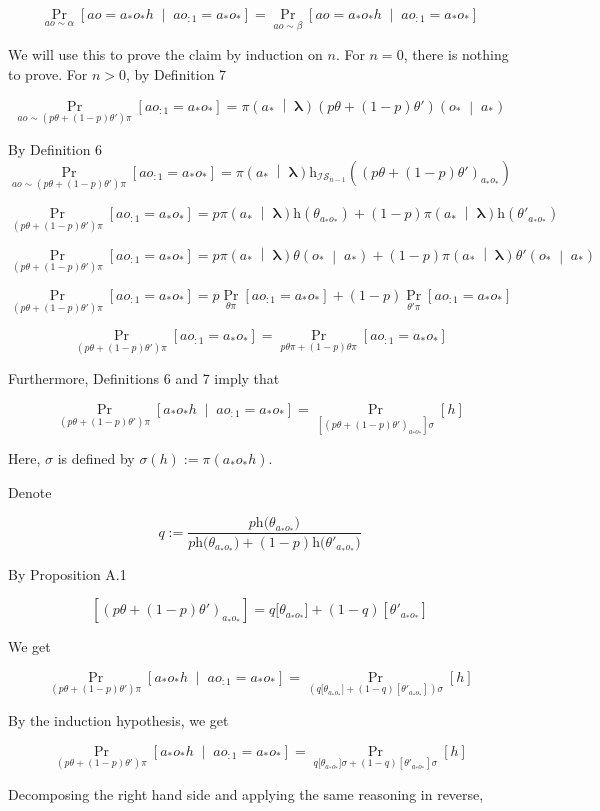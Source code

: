\documentclass[a4paper]{article}
\newcommand{\AP}[1]{\left(#1\right)}
\newcommand{\AB}[1]{\left[#1\right]}
\newcommand{\APM}[2]{\left(#1\;\middle\vert\;#2\right)}
\newcommand{\ABM}[2]{\left[#1\;\middle\vert\;#2\right]}
\newcommand{\Pa}[2]{\underset{#1}{\operatorname{Pr}}\AB{#2}}
\newcommand{\CP}[3]{\underset{#1}{\operatorname{Pr}}\ABM{#2}{#3}}
\newcommand{\Estr}{\boldsymbol{\lambda}}
\newcommand{\Ht}{\mathrm{h}}
\newcommand{\IS}{\mathcal{IS}}
\begin{document}
$$\CP{ao\sim\alpha}{ao=a_*o_*h}{ao_{:1}=a_*o_*}=\CP{ao\sim\beta}{ao=a_*o_*h}{ao_{:1}=a_*o_*}$$

We will use this to prove the claim by induction on $n$. For $n=0$, there is nothing to prove. For $n>0$, by Definition 7

$$\Pa{ao\sim\AP{p\theta+(1-p)\theta'}\pi}{ao_{:1}=a_*o_*}=\pi\APM{a_*}{\Estr}\AP{p\theta+(1-p)\theta'}\APM{o_*}{ a_*}$$

By Definition 6
$$\Pa{ao\sim\AP{p\theta+(1-p)\theta'}\pi}{ao_{:1}=a_*o_*}=\pi\APM{a_*}{\Estr}\Ht_{\IS_{n-1}}\AP{\AP{p\theta+(1-p)\theta'}_{a_*o_*}}$$

$$\Pa{\AP{p\theta+(1-p)\theta'}\pi}{ao_{:1}=a_*o_*}=p\pi\APM{a_*}{\Estr}\Ht\AP{\theta_{a_*o_*}}+(1-p)\pi\APM{a_*}{\Estr}\Ht\AP{\theta'_{a_*o_*}}$$

$$\Pa{\AP{p\theta+(1-p)\theta'}\pi}{ao_{:1}=a_*o_*}=p\pi\APM{a_*}{\Estr}\theta\APM{o_*}{a_*}+(1-p)\pi\APM{a_*}{\Estr}\theta'\APM{o_*}{a_*}$$

$$\Pa{\AP{p\theta+(1-p)\theta'}\pi}{ao_{:1}=a_*o_*}=p\Pa{\theta\pi}{ao_{:1}=a_*o_*}+(1-p)\Pa{\theta'\pi}{ao_{:1}=a_*o_*}$$

$$\Pa{\AP{p\theta+(1-p)\theta'}\pi}{ao_{:1}=a_*o_*}=\Pa{p\theta\pi+(1-p)\theta\pi}{ao_{:1}=a_*o_*}$$

Furthermore, Definitions 6 and 7 imply that

$$\CP{\AP{p\theta+(1-p)\theta'}\pi}{a_*o_*h}{ao_{:1}=a_*o_*}=\Pa{\AB{\AP{p\theta+(1-p)\theta'}_{a_*o_*}}\sigma}{h}$$

Here, $\sigma$ is defined by $\sigma(h):=\pi\AP{a_*o_*h}$. 

Denote

$$q:=\frac{p\Ht\big(\theta_{a_*o_*}\big)}{p\Ht\big(\theta_{a_*o_*}\big)+(1-p)\Ht\big(\theta'_{a_*o_*}\big)}$$

By Proposition A.1

$$\AB{\AP{p\theta+(1-p)\theta'}_{a_*o_*}}=q\big[\theta_{a_*o_*}\big]+(1-q)\AB{\theta'_{a_*o_*}}$$


We get

$$\CP{\AP{p\theta+(1-p)\theta'}\pi}{a_*o_*h}{ao_{:1}=a_*o_*}=\Pa{\AP{q\big[\theta_{a_*o_*}\big]+(1-q)\AB{\theta'_{a_*o_*}}}\sigma}{h}$$

By the induction hypothesis, we get

$$\CP{\AP{p\theta+(1-p)\theta'}\pi}{a_*o_*h}{ao_{:1}=a_*o_*}=\Pa{q\big[\theta_{a_*o_*}\big]\sigma+(1-q)\AB{\theta'_{a_*o_*}}\sigma}{h}$$

Decomposing the right hand side and applying the same reasoning in reverse,
\end{document}
